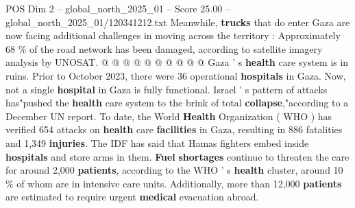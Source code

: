 \begin{textsample}{POS Dim 2 – global\_north\_2025\_01 – Score 25.00 – global\_north\_2025\_01/120341212.txt}
Meanwhile, \textbf{trucks} that do enter Gaza are now facing additional challenges in moving across the territory : Approximately 68 \% of the road network has been damaged, according to satellite imagery analysis by UNOSAT. @ @ @ @ @ @ @ @ @ @ Gaza ' s \textbf{health} care system is in ruins.
Prior to October 2023, there were 36 operational \textbf{hospitals} in Gaza.
Now, not a single \textbf{hospital} in Gaza is fully functional.
Israel ' s pattern of attacks has"pushed the \textbf{health} care system to the brink of total \textbf{collapse},"according to a December UN report.
To date, the World \textbf{Health} Organization ( WHO ) has verified 654 attacks on \textbf{health} care \textbf{facilities} in Gaza, resulting in 886 fatalities and 1,349 \textbf{injuries}.
The IDF has said that Hamas fighters embed inside \textbf{hospitals} and store arms in them. \textbf{Fuel} \textbf{shortages} continue to threaten the care for around 2,000 \textbf{patients}, according to the WHO ' s \textbf{health} cluster, around 10 \% of whom are in intensive care units.
Additionally, more than 12,000 \textbf{patients} are estimated to require urgent \textbf{medical} evacuation abroad.

\end{textsample}
